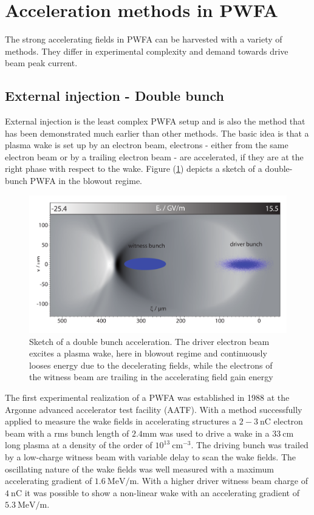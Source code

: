 \section{Acceleration methods in PWFA}
The strong accelerating fields in PWFA can be harvested with a variety of methods. They differ in experimental complexity and demand towards drive beam peak current.



\subsection{External injection - Double bunch}
External injection is the least complex PWFA setup and is also the method that has been demonstrated much earlier than other methods. The basic idea is that a plasma wake is set up by an electron beam, electrons - either from the same electron beam or by a trailing electron beam - are accelerated, if they are at the right phase with respect to the wake.
Figure (\ref{img:DoubleBunch}) depicts a sketch of a double-bunch PWFA in the blowout regime.
\begin{figure}[h]
\begin{center}
\includegraphics[width=1.0\textwidth]{simulations/images/edited/DoubleBunch.pdf}
\end{center}
\caption{Sketch of a double bunch acceleration. The driver electron beam excites a plasma wake, here in blowout regime and continuously looses energy due to the decelerating fields, while the electrons of the witness beam are trailing in the accelerating field gain energy}
\label{img:DoubleBunch}
\end{figure}

The first experimental realization of a PWFA was established in 1988 at the Argonne advanced accelerator test facility (AATF)\cite{rosenzweig1988experimental}. With a method successfully applied to measure the wake fields in accelerating structures
a $2-3\ \mathrm{nC}$ electron beam with a rms bunch length of $2.4 \mathrm{mm}$ was used to drive a wake in a $33\ \mathrm{cm} $ long plasma at a density of the order of $ 10^{13}\ \mathrm{cm}^{-3}$. The driving bunch was trailed by a low-charge witness beam with variable delay to scan the wake fields.
The oscillating nature of the wake fields was well measured with a maximum accelerating gradient of $1.6\ \mathrm{MeV/m}$. 
With a higher driver witness beam charge of $4\ \mathrm{nC}$ \cite{figueroa1988direct} it was possible to show a non-linear wake with an accelerating gradient of $5.3\ \mathrm{MeV/m}$. 

